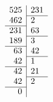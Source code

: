 \documentclass[8pt, aspectratio=169]{beamer}
\begin{document}
\begin{frame}
    $$
    \begin{array}{r|l}
        525 & 231 \\ \cline{2-2}
        462 & 2 \\ \cline{1-1}
        231 & 63 \\ \cline{2-2}
        189 & 3 \\ \cline{1-1}
        63 & 42 \\ \cline{2-2}
        42 & 1 \\ \cline{1-1}
        42 & 21 \\ \cline{2-2}
        42 & 2 \\ \cline{1-1}
        0 &
    \end{array}
    $$
\end{frame}
\end{document}
